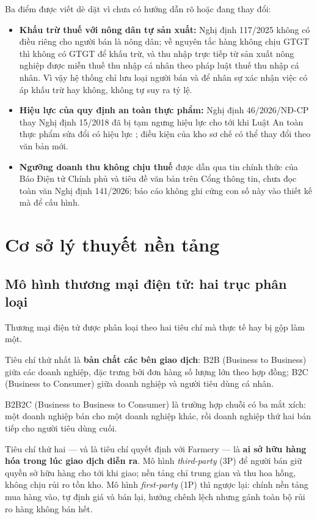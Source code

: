 Ba điểm được viết dè dặt vì chưa có hướng dẫn rõ hoặc đang thay đổi:
\begin{itemize}
    \item \textbf{Khấu trừ thuế với nông dân tự sản xuất:} Nghị định 117/2025 không có điều riêng cho người bán là nông dân; về nguyên tắc hàng không chịu GTGT thì không có GTGT để khấu trừ, và thu nhập trực tiếp từ sản xuất nông nghiệp được miễn thuế thu nhập cá nhân theo pháp luật thuế thu nhập cá nhân. Vì vậy hệ thống chỉ lưu loại người bán và để nhân sự xác nhận việc có áp khấu trừ hay không, không tự suy ra tỷ lệ.
    \item \textbf{Hiệu lực của quy định an toàn thực phẩm:} Nghị định 46/2026/NĐ-CP thay Nghị định 15/2018 đã bị tạm ngưng hiệu lực cho tới khi Luật An toàn thực phẩm sửa đổi có hiệu lực \parencite{nq15_2026}; điều kiện của kho sơ chế có thể thay đổi theo văn bản mới.
    \item \textbf{Ngưỡng doanh thu không chịu thuế} được dẫn qua tin chính thức của Báo Điện tử Chính phủ và tiêu đề văn bản trên Cổng thông tin, chưa đọc toàn văn Nghị định 141/2026; báo cáo không ghi cứng con số này vào thiết kế mà để cấu hình.
\end{itemize}

\section{Cơ sở lý thuyết nền tảng}
\label{sec:lythuyet}

\subsection{Mô hình thương mại điện tử: hai trục phân loại}
\label{subsec:haitruc}

Thương mại điện tử được phân loại theo hai tiêu chí mà thực tế hay bị gộp làm một.

Tiêu chí thứ nhất là \textbf{bản chất các bên giao dịch}: B2B (Business to Business) giữa các doanh nghiệp, đặc trưng bởi đơn hàng số lượng lớn theo hợp đồng; B2C (Business to Consumer) giữa doanh nghiệp và người tiêu dùng cá nhân.

B2B2C (Business to Business to Consumer) là trường hợp chuỗi có ba mắt xích: một doanh nghiệp bán cho một doanh nghiệp khác, rồi doanh nghiệp thứ hai bán tiếp cho người tiêu dùng cuối.

Tiêu chí thứ hai --- và là tiêu chí quyết định với Farmery --- là \textbf{ai sở hữu hàng hóa trong lúc giao dịch diễn ra}. Mô hình \emph{third-party} (3P) để người bán giữ quyền sở hữu hàng cho tới khi giao; nền tảng chỉ trung gian và thu hoa hồng, không chịu rủi ro tồn kho. Mô hình \emph{first-party} (1P) thì ngược lại: chính nền tảng mua hàng vào, tự định giá và bán lại, hưởng chênh lệch nhưng gánh toàn bộ rủi ro hàng không bán hết.

